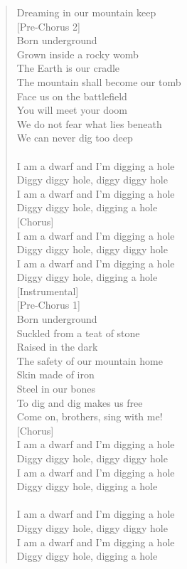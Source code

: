 \documentclass[11pt]{article}
\begin{document}
\begin{verse}
Dreaming in our mountain keep\\
\vspace*{1em}
[Pre-Chorus 2]\\
Born underground\\
Grown inside a rocky womb\\
The Earth is our cradle\\
The mountain shall become our tomb\\
Face us on the battlefield\\
You will meet your doom\\
We do not fear what lies beneath\\
We can never dig too deep\\
[Chorus]\\
I am a dwarf and I'm digging a hole\\
Diggy diggy hole, diggy diggy hole\\
I am a dwarf and I'm digging a hole\\
Diggy diggy hole, digging a hole\\
\vspace*{1em}
[Chorus]\\
I am a dwarf and I'm digging a hole\\
Diggy diggy hole, diggy diggy hole\\
I am a dwarf and I'm digging a hole\\
Diggy diggy hole, digging a hole\\
\vspace*{1em}
[Instrumental]\\
\vspace*{1em}
[Pre-Chorus 1]\\
Born underground\\
Suckled from a teat of stone\\
Raised in the dark\\
The safety of our mountain home\\
Skin made of iron\\
Steel in our bones\\
To dig and dig makes us free\\
Come on, brothers, sing with me!\\
\vspace*{1em}
[Chorus]\\
I am a dwarf and I'm digging a hole\\
Diggy diggy hole, diggy diggy hole\\
I am a dwarf and I'm digging a hole\\
Diggy diggy hole, digging a hole\\
[Chorus]\\
I am a dwarf and I'm digging a hole\\
Diggy diggy hole, diggy diggy hole\\
I am a dwarf and I'm digging a hole\\
Diggy diggy hole, digging a hole\\
\end{verse}
\clearpage
\end{document}
